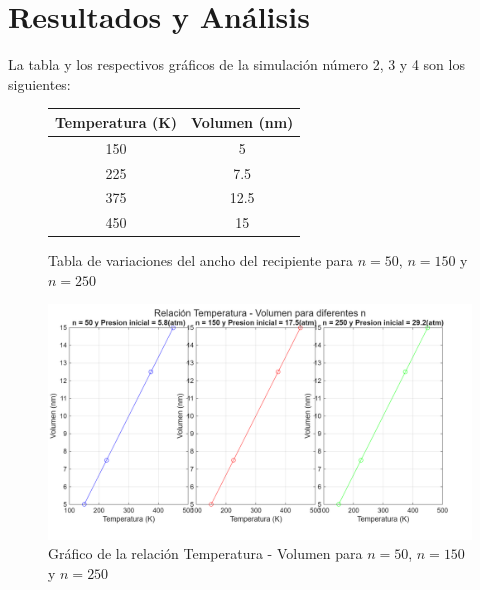 \documentclass[12pt]{article}
\begin{document}
\section*{Resultados y Análisis}

La tabla y los respectivos gráficos de la simulación número 2, 3 y 4 son los siguientes:
\begin{figure}[ht!]
    \centering
    \begin{minipage}{0.48\textwidth}
        \centering
        \begin{tabular}{|c|c|}
            \hline
            \textbf{Temperatura (K)} & \textbf{Volumen (nm)} \\
            \hline
            150 & 5 \\
            225 & 7.5 \\
            375 & 12.5 \\
            450 & 15 \\
            \hline
        \end{tabular}
        \caption{Tabla de variaciones del ancho del recipiente para $n = 50$, $n= 150$ y $n=250$}
        \label{tabla3en1}
    \end{minipage} \hspace{0.04\textwidth}  %
    
    \begin{minipage}{0.7\textwidth}
        \centering
        \includegraphics[width=\textwidth]{informe 2 termos/graficosTV.png}
        \caption{Gráfico de la relación Temperatura - Volumen para $n = 50$, $n= 150$ y $n=250$}
        \label{3grafico}
    \end{minipage}
\end{figure}
\end{document}
